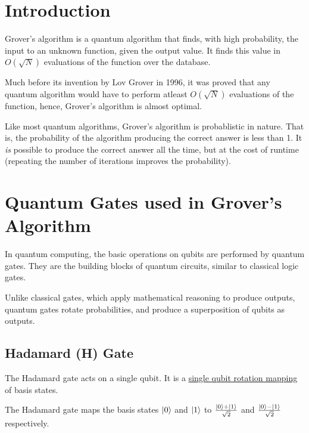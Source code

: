 \documentclass[a4paper]{article}
\begin{document}
\section{Introduction}

Grover's algorithm is a quantum algorithm that finds, with high probability,
the input to an unknown function, given the output value. It finds this value
in $ O(\sqrt{N}) $ evaluations of the function over the database.
\\
\par

Much before its invention by Lov Grover in 1996, it was proved that any quantum
algorithm would have to perform atleast $O(\sqrt{N})$ evaluations of the
function, hence, Grover's algorithm is almost optimal.
\\
\par
Like most quantum algorithms, Grover's algorithm is probablistic in nature.
That is, the probability of the algorithm producing the correct answer is less
than 1.  It \textit{is} possible to produce the correct answer all the time,
but at the cost of runtime (repeating the number of iterations improves the
probability).

\pagebreak


\section{Quantum Gates used in Grover's Algorithm}

In quantum computing, the basic operations on qubits are performed by quantum gates.
They are the building blocks of quantum circuits, similar to classical logic gates.
\\
\par
Unlike classical gates, which apply mathematical reasoning to produce outputs, 
quantum gates rotate probabilities, and produce a superposition of qubits as outputs.

\subsection{ Hadamard (H) Gate }
The Hadamard gate acts on a single qubit. It is a \underline{single qubit
rotation mapping} of basis states.
\\
\par
The Hadamard gate maps the basis states $\ket{0}$ and $\ket{1}$ to 
$ \frac{\ket{0} + \ket{1}}{\sqrt2}$ and $ \frac{\ket{0} - \ket{1}}{\sqrt2}$ 
respectively.
\end{document}
